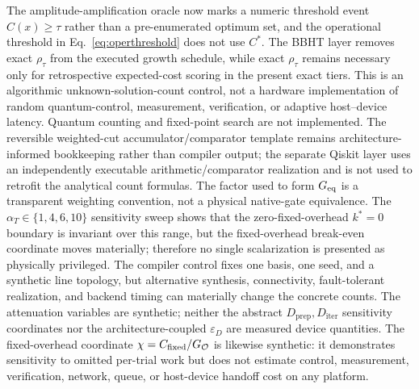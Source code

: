 \documentclass[5p,times]{elsarticle}
\begin{document}
The amplitude-amplification oracle now marks a numeric threshold event $C(x)\geq\tau$ rather than a pre-enumerated optimum set, and the operational threshold in Eq.~\eqref{eq:operthreshold} does not use $C^*$. The BBHT layer removes exact $\rho_\tau$ from the executed growth schedule, while exact $\rho_\tau$ remains necessary only for retrospective expected-cost scoring in the present exact tiers. This is an algorithmic unknown-solution-count control, not a hardware implementation of random quantum-control, measurement, verification, or adaptive host--device latency. Quantum counting and fixed-point search are not implemented. The reversible weighted-cut accumulator/comparator template remains architecture-informed bookkeeping rather than compiler output; the separate Qiskit layer uses an independently executable arithmetic/comparator realization and is not used to retrofit the analytical count formulas. The factor used to form $G_{\rm eq}$ is a transparent weighting convention, not a physical native-gate equivalence. The $\alpha_T\in\{1,4,6,10\}$ sensitivity sweep shows that the zero-fixed-overhead $k^*=0$ boundary is invariant over this range, but the fixed-overhead break-even coordinate moves materially; therefore no single scalarization is presented as physically privileged. The compiler control fixes one basis, one seed, and a synthetic line topology, but alternative synthesis, connectivity, fault-tolerant realization, and backend timing can materially change the concrete counts. The attenuation variables are synthetic; neither the abstract $D_{\mathrm{prep}},D_{\mathrm{iter}}$ sensitivity coordinates nor the architecture-coupled $\varepsilon_D$ are measured device quantities. The fixed-overhead coordinate $\chi=C_{\rm fixed}/G_{\mathcal O}$ is likewise synthetic: it demonstrates sensitivity to omitted per-trial work but does not estimate control, measurement, verification, network, queue, or host-device handoff cost on any platform.
\end{document}

